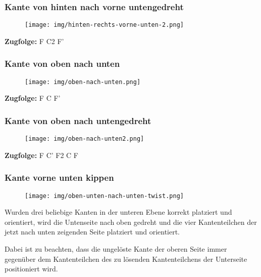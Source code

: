 \documentclass[letterpaper,10pt,twoside,twocolumn,openany]{book}
\begin{document}
\subsubsection{Kante von hinten nach vorne unten\newline gedreht}
\begin{figure}[!htb] 
  \centering
     \texttt{[image: img/hinten-rechts-vorne-unten-2.png]}
\end{figure}
\centering \textbf{Zugfolge:} F C2 F'

\subsubsection{Kante von oben nach unten}
\begin{figure}[!htb] 
  \centering
     \texttt{[image: img/oben-nach-unten.png]}
\end{figure}
\centering \textbf{Zugfolge:} F C F'

\newpage
\subsubsection{Kante von oben nach unten\newline gedreht}
\begin{figure}[!htb] 
  \centering
     \texttt{[image: img/oben-nach-unten2.png]}
\end{figure}
\centering \textbf{Zugfolge:} F C' F2 C F

\subsubsection{Kante vorne unten kippen}
\begin{figure}[!htb] 
  \centering
     \texttt{[image: img/oben-unten-nach-unten-twist.png]}
\end{figure}

\begin{justify}
Wurden drei beliebige Kanten in der unteren Ebene korrekt platziert und orientiert, wird die Untenseite nach oben gedreht und die vier Kantenteilchen der jetzt nach unten zeigenden Seite platziert und orientiert.

\indent Dabei ist zu beachten, dass die ungelöste Kante der oberen Seite immer gegenüber dem Kantenteilchen des zu lösenden Kantenteilchens der Unterseite positioniert wird. 
\end{justify}
\end{document}
